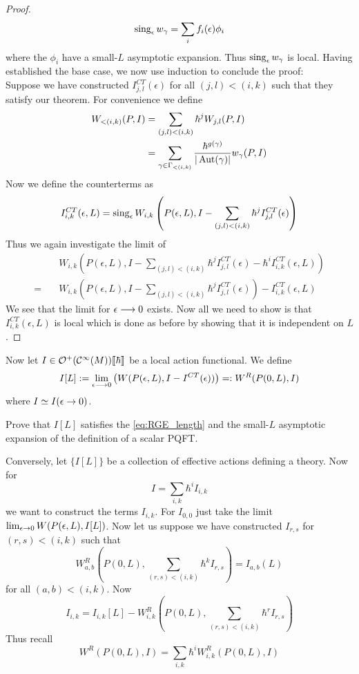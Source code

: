 \begin{theo}
\begin{proof}
  $$ \sing_\epsilon w_\gamma = \sum_i f_i(\epsilon) \phi_i $$
  where the $\phi_i$ have a small-$L$ asymptotic expansion. Thus $\sing_\epsilon w_\gamma$ is local. Having established the base case, we now use induction to conclude the proof:\\
  Suppose we have constructed $I_{j,l}^{CT}(\epsilon)$ for all $(j,l)<(i,k)$ such that they satisfy our theorem. For convenience we define
  \begin{align*}
    W_{<(i,k)} (P,I) &= \sum_{(j,l)<(i,k)} \hbar^j W_{j,l}(P,I)\\
    &= \sum_{\gamma \in \Gamma_{<(i,k)}} \frac{\hbar^{g(\gamma)}}{|\operatorname{Aut}(\gamma)|} w_\gamma (P,I)
  \end{align*}
  Now we define the counterterms as
  $$ I_{i,k}^{CT}(\epsilon, L) = \sing_\epsilon W_{i,k}\left(P(\epsilon,L), I - \sum_{(j,l)<(i,k)}\hbar^j I_{j,l}^{CT}(\epsilon)\right) $$
  Thus we again investigate the limit of
  \begin{align*}
    &W_{i,k}\left( P(\epsilon,L), I - \sum_{(j,l)<(i,k)}\hbar^j I_{j,l}^{CT}(\epsilon) - \hbar^i I_{i,k}^{CT}(\epsilon, L) \right)\\
    = \quad &W_{i,k}\left( P(\epsilon,L), I - \sum_{(j,l)<(i,k)}\hbar^j I_{j,l}^{CT}(\epsilon) \right) - I_{i,k}^{CT}(\epsilon, L)
  \end{align*}
  We see that the limit for $\epsilon \lra 0$ exists. Now all we need to show is that $I_{i,k}^{CT}(\epsilon,L)$ is local which is done as before by showing that it is independent on $L$.
\end{proof}
\end{theo}

Now let $I \in \mathcal{O}^+(\mathcal{C}^{\infty}(M))\llbracket\hbar\rrbracket$ be a local action functional. We define
$$ I[L] := \lim_{\epsilon \lra 0} \left( W(P(\epsilon,L), I - I^{CT}(\epsilon)) \right) =: W^R(P(0,L), I) $$
where $I \simeq I(\epsilon \ra 0) $.

\begin{ex}
  Prove that $I[L]$ satisfies the \eqref{eq:RGE_length} and the small-$L$ asymptotic expansion of the definition of a scalar PQFT.
\end{ex}

Conversely, let $\{I[L]\}$ be a collection of effective actions defining a theory. Now for
$$ I = \sum_{i,k} \hbar^i I_{i,k} $$
we want to construct the terms $I_{i,k}$. For $I_{0,0}$ just take the limit $\lim_{\epsilon \ra 0} W(P(\epsilon,L), I[L])$. Now let us suppose we have constructed $I_{r,s}$ for $(r,s)<(i,k)$ such that
$$ W^R_{a,b}\left(P(0,L), \sum_{(r,s)<(i,k)} \hbar^k I_{r,s}\right) = I_{a,b}(L)$$
for all $(a,b) < (i,k)$. Now
$$I_{i,k} = I_{i,k}[L] - W^R_{i,k}\left(P(0,L), \sum_{(r,s)<(i,k)} \hbar^r I_{r,s} \right)$$
Thus recall
$$ W^R(P(0,L), I) = \sum_{i,k} \hbar^i W_{i,k}^R (P(0,L), I) $$

